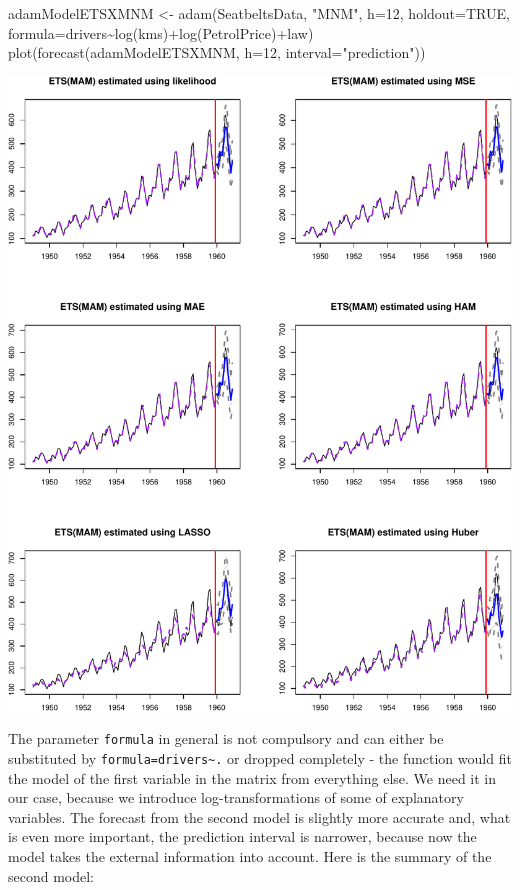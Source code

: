 \documentclass[
]{book}
\newenvironment{Shaded}{\begin{snugshade}}{\end{snugshade}}
\newcommand{\AttributeTok}[1]{\textcolor[rgb]{0.77,0.63,0.00}{#1}}
\newcommand{\ConstantTok}[1]{\textcolor[rgb]{0.00,0.00,0.00}{#1}}
\newcommand{\DecValTok}[1]{\textcolor[rgb]{0.00,0.00,0.81}{#1}}
\newcommand{\FunctionTok}[1]{\textcolor[rgb]{0.00,0.00,0.00}{#1}}
\newcommand{\NormalTok}[1]{#1}
\newcommand{\OtherTok}[1]{\textcolor[rgb]{0.56,0.35,0.01}{#1}}
\newcommand{\SpecialCharTok}[1]{\textcolor[rgb]{0.00,0.00,0.00}{#1}}
\newcommand{\StringTok}[1]{\textcolor[rgb]{0.31,0.60,0.02}{#1}}
\theoremstyle{definition}
\theoremstyle{definition}
\theoremstyle{definition}
\theoremstyle{definition}
\theoremstyle{remark}
\begin{document}
\begin{Shaded}
\begin{Highlighting}[]
\NormalTok{adamModelETSXMNM }\OtherTok{\textless{}{-}} \FunctionTok{adam}\NormalTok{(SeatbeltsData, }\StringTok{"MNM"}\NormalTok{, }\AttributeTok{h=}\DecValTok{12}\NormalTok{, }\AttributeTok{holdout=}\ConstantTok{TRUE}\NormalTok{,}
                         \AttributeTok{formula=}\NormalTok{drivers}\SpecialCharTok{\textasciitilde{}}\FunctionTok{log}\NormalTok{(kms)}\SpecialCharTok{+}\FunctionTok{log}\NormalTok{(PetrolPrice)}\SpecialCharTok{+}\NormalTok{law)}
\FunctionTok{plot}\NormalTok{(}\FunctionTok{forecast}\NormalTok{(adamModelETSXMNM, }\AttributeTok{h=}\DecValTok{12}\NormalTok{, }\AttributeTok{interval=}\StringTok{"prediction"}\NormalTok{))}
\end{Highlighting}
\end{Shaded}

\includegraphics{adam_files/figure-latex/unnamed-chunk-75-1.pdf}

The parameter \texttt{formula} in general is not compulsory and can either be substituted by \texttt{formula=drivers\textasciitilde{}.} or dropped completely - the function would fit the model of the first variable in the matrix from everything else. We need it in our case, because we introduce log-transformations of some of explanatory variables. The forecast from the second model is slightly more accurate and, what is even more important, the prediction interval is narrower, because now the model takes the external information into account. Here is the summary of the second model:
\end{document}
